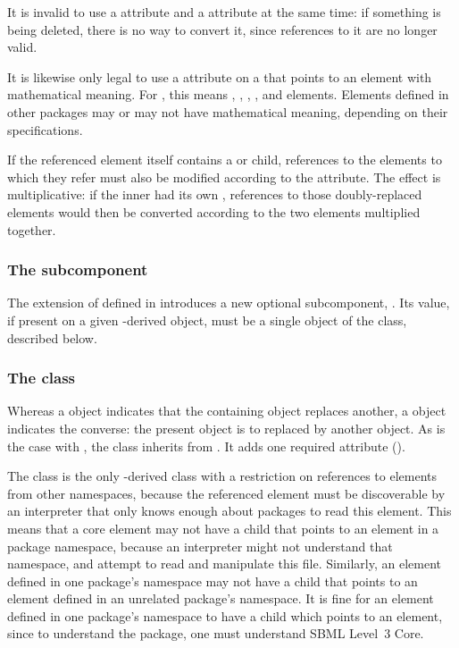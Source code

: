 It is invalid to use a  attribute and a
 attribute at the same time: if something is being
deleted, there is no way to convert it, since references to it are no
longer valid.

It is likewise only legal to use a  attribute on
a \ReplacedElement that points to an element with mathematical meaning.
For \sbmlthreecore, this means \Compartment, \Parameter, \Reaction,
\Species, and \SpeciesReference elements.  Elements defined in other
packages may or may not have mathematical meaning, depending on their
specifications.

If the referenced element itself contains a \ReplacedElement or \ReplacedBy child,
references to the elements to which they refer must also be modified according
to the  attribute.  The effect is multiplicative:
if the inner \ReplacedElement had its own , references
to those doubly-replaced elements would then be converted according to the
two  elements multiplied together.

\subsubsection{The \fixttspace{} subcomponent}

The extension of \SBase defined in  introduces a
new optional subcomponent, .  Its value, if present on
a given \SBase-derived object, must be a single object of the
\ReplacedBy class, described below.


\subsubsection{The \ReplacedBy class}
\label{replacedby-class}

Whereas a \ReplacedElement object indicates that the containing object
replaces another, a \ReplacedBy object indicates the converse: the
present object is to replaced by another object.  As is the case with
\ReplacedElement, the \ReplacedBy class inherits from \SBaseRef.  It
adds one required attribute ().

The \ReplacedBy class is the only \SBaseRef-derived class with a
restriction on references to elements from other namespaces, because the
referenced element must be discoverable by an interpreter that only
knows enough about packages to read this element.  This means that a
core element may not have a \ReplacedBy child that points to an element
in a package namespace, because an interpreter might not understand that
namespace, and attempt to read and manipulate this file.  Similarly, an
element defined in one package's namespace may not have a \ReplacedBy
child that points to an element defined in an unrelated package's
namespace.  It is fine for an element defined in one package's namespace
to have a \ReplacedBy child which points to an \sbmlthreecore element,
since to understand the package, one must understand SBML Level~3 Core.

